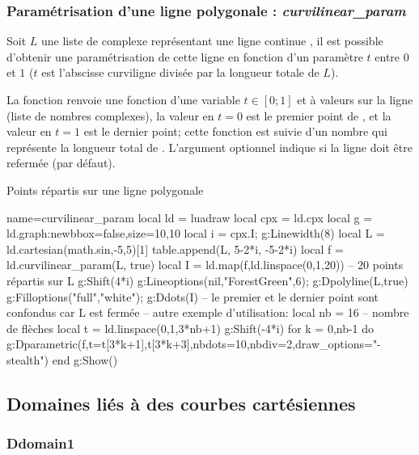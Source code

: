 \subsubsection{Paramétrisation d'une ligne polygonale : \emph{curvilinear\_param}}
Soit $L$ une liste de complexe représentant une ligne \og continue \fg, il est possible d'obtenir une paramétrisation de cette ligne en fonction d'un paramètre $t$ entre $0$ et $1$ ($t$ est l'abscisse curviligne divisée par la longueur totale de $L$).

La fonction  renvoie une fonction d'une variable $t\in[0;1]$ et à valeurs sur la ligne  (liste de nombres complexes), la valeur en $t=0$ est le premier point de , et la valeur en $t=1$ est le dernier point; cette fonction est suivie d'un nombre qui représente la longueur total de . L'argument optionnel  indique si la ligne  doit être refermée (\false par défaut).

\begin{demo}{Points répartis sur une ligne polygonale}
\begin{luadraw}{name=curvilinear_param}
local ld = luadraw
local cpx = ld.cpx
local g = ld.graph:new{bbox=false,size={10,10}}
local i = cpx.I; g:Linewidth(8)
local L = ld.cartesian(math.sin,-5,5)[1]
table.append(L, {5-2*i, -5-2*i})
local f = ld.curvilinear_param(L, true)
local I = ld.map(f,ld.linspace(0,1,20)) -- 20 points répartis sur L
g:Shift(4*i)
g:Lineoptions(nil,"ForestGreen",6); g:Dpolyline(L,true)
g:Filloptions("full","white"); g:Ddots(I) -- le premier et le dernier point sont confondus car L est fermée
-- autre exemple d'utilisation:
local nb = 16 -- nombre de flèches
local t = ld.linspace(0,1,3*nb+1)
g:Shift(-4*i)
for k = 0,nb-1 do
g:Dparametric(f,{t={t[3*k+1],t[3*k+3]},nbdots=10,nbdiv=2,draw_options="-stealth"})
end
g:Show()
\end{luadraw}
\end{demo}


\subsection{Domaines liés à des courbes cartésiennes}

\subsubsection{Ddomain1}

